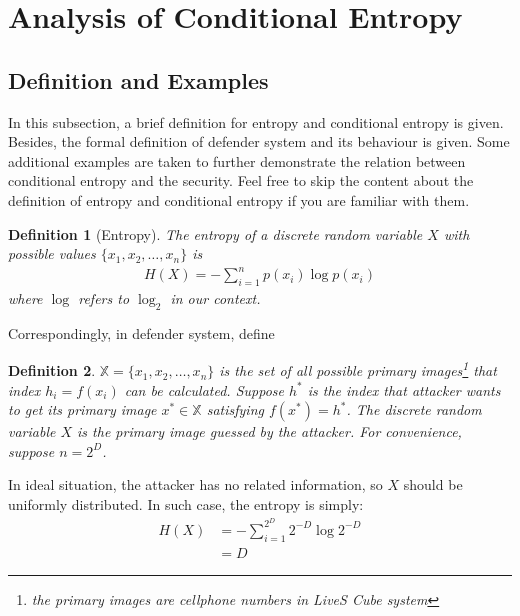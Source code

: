 \documentclass[10pt,a4paper]{article}
\newtheorem{mydef}{Definition}
\begin{document}
\section{Analysis of Conditional Entropy}
	\subsection{Definition and Examples}
		In this subsection, a brief definition for entropy and conditional
		entropy is given. Besides, the formal definition of defender system
		and its behaviour is given.
		Some additional examples are taken to further
		demonstrate the relation between conditional entropy and
		the security. Feel free to skip the content about
		the definition of entropy and conditional entropy if you are familiar
		with them.		
		
		\begin{mydef}[Entropy]
			The entropy of a discrete random variable $X$ with
			possible values $\{x_1, x_2, \ldots, x_n\}$ is
			\begin{align}
				H(X) = -\sum_{i=1}^n p(x_i)\log p(x_i)
			\end{align}
			where $\log$ refers to $\log_2$ in our context.
		\end{mydef}
		
		Correspondingly, in defender system, define
		\begin{mydef}
			$\mathbb{X} = \{x_1, x_2, \ldots, x_n\}$ is the set of all possible 
			primary images\footnote{the primary images are cellphone numbers
			in LiveS Cube system} that index $h_i = f(x_i)$ can be calculated.
			Suppose $h^*$ is the index that attacker wants to
			get its primary image $x^* \in \mathbb{X}$ satisfying $f(x^*) = h^*$.
			The discrete random variable $X$ is the
			primary image guessed by the attacker. For convenience,
			suppose $n = 2^D$.
		\end{mydef}
		
		In ideal situation, the attacker has no related information, so $X$ should
		be uniformly distributed. In such case, the entropy is simply:
		\begin{align}
			H(X) &= -\sum_{i=1}^{2^D} 2^{-D} \log 2^{-D}\\
				&= D
		\end{align}
		
\end{document}
